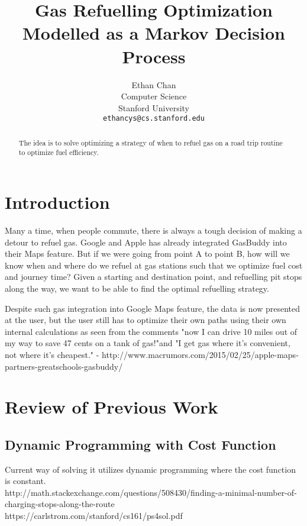 \documentclass[10pt,twocolumn,letterpaper]{article}
\begin{document}
\title{Gas Refuelling Optimization Modelled as a Markov Decision Process}

\author{
Ethan Chan\\
Computer Science\\
Stanford University\\
{\tt\small ethancys@cs.stanford.edu}
}

\maketitle

\begin{abstract}
The idea is to solve optimizing a strategy of when to refuel gas on a road trip routine to optimize fuel efficiency.
\end{abstract}

\section{Introduction}
Many a time, when people commute, there is always a tough decision of making a detour to refuel gas. Google and Apple has already integrated GasBuddy into their Maps feature. But if we were going from point A to point B, how will we know when and where do we refuel at gas stations such that we optimize fuel cost and journey time? Given a starting and destination point, and refuelling pit stops along the way, we want to be able to find the optimal refuelling strategy.

Despite such gas integration into Google Maps feature, the data is now presented at the user, but the user still has to optimize their own paths using their own internal calculations as seen from the comments "now I can drive 10 miles out of my way to save 47 cents on a tank of gas!"and "I get gas where it's convenient, not where it's cheapest." - http://www.macrumors.com/2015/02/25/apple-maps-partners-greatschools-gasbuddy/ 


\section{Review of Previous Work}

\subsection{Dynamic Programming with Cost Function}
Current way of solving it utilizes dynamic programming where the cost function is constant.\\
http://math.stackexchange.com/questions/508430/finding-a-minimal-number-of-charging-stops-along-the-route\\
https://carlstrom.com/stanford/cs161/ps4sol.pdf\\
\end{document}
